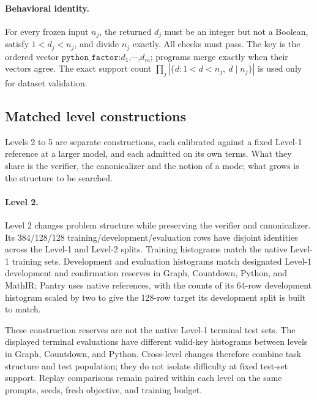 \documentclass{article}
\newcommand{\1}{\mathbf 1}
\theoremstyle{remark}
\theoremstyle{definition}
\theoremstyle{plain}
\begin{document}
\paragraph{Behavioral identity.}
\label{app:python-identity}
For every frozen input $n_j$, the returned $d_j$ must be an integer but not a
Boolean, satisfy $1<d_j<n_j$, and divide $n_j$ exactly. All checks must pass.
The key is the ordered vector
$\texttt{python\_factor:}d_1\texttt{,}\cdots\texttt{,}d_m$;
programs merge exactly when their vectors agree. The exact support count
$\prod_j|\{d:1<d<n_j,\ d\mid n_j\}|$ is used only for dataset validation.

\subsection{Matched level constructions}
\label{app:data-levels}

Levels 2 to 5 are separate constructions, each calibrated against a fixed
Level-1 reference at a larger model, and each admitted on its own terms. What
they share is the verifier, the canonicalizer and the notion of a mode; what
grows is the structure to be searched.

\paragraph{Level 2.}
Level 2 changes problem structure while preserving the verifier and
canonicalizer. Its 384/128/128 training/development/evaluation rows have
disjoint identities across the Level-1 and Level-2 splits. Training histograms
match the native Level-1 training sets. Development and evaluation histograms
match designated Level-1 development and confirmation reserves in Graph,
Countdown, Python, and MathIR; Pantry uses native references, with the counts of its
64-row development histogram scaled by two to give the 128-row target its
development split is built to match.

These construction reserves are not the native Level-1 terminal test sets.
The displayed terminal evaluations have different valid-key histograms
between levels in Graph, Countdown, and Python. Cross-level changes therefore
combine task structure and test population; they do not isolate difficulty
at fixed test-set support. Replay comparisons remain paired within each
level on the same prompts, seeds, fresh objective, and training budget.
\end{document}
